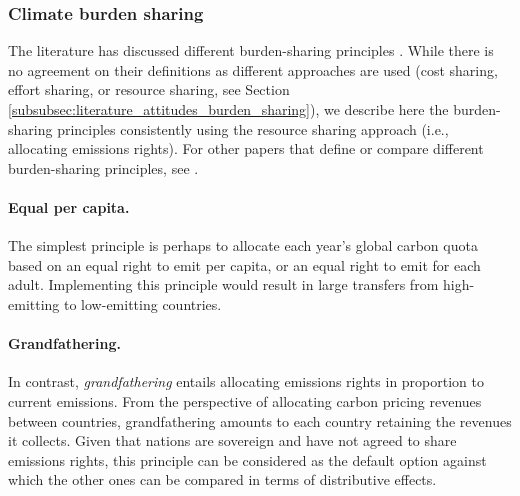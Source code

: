 
\subsubsection{Climate burden sharing}\label{subsubsec:literature_burden_sharing} 

The literature has discussed different burden-sharing principles . While there is no  agreement on their definitions as different approaches are used (cost sharing, effort sharing, or resource sharing, see Section \ref{subsubsec:literature_attitudes_burden_sharing}), we describe here the burden-sharing principles consistently using the resource sharing approach (i.e., allocating emissions rights). For other papers that define or compare different burden-sharing principles, see . %

\paragraph{Equal per capita.} The simplest principle is perhaps to allocate each year's global carbon quota based on an equal right to emit per capita, or an equal right to emit for each adult. Implementing this principle would result in large transfers from high-emitting to low-emitting countries. 

\paragraph{Grandfathering.} In contrast, \textit{grandfathering} entails allocating emissions rights in proportion to current emissions. From the perspective of allocating carbon pricing revenues between countries, grandfathering amounts to each country retaining the revenues it collects. Given that nations are sovereign and have not agreed to share emissions rights, this principle can be considered as the default option against which the other ones can be compared in terms of distributive effects.

